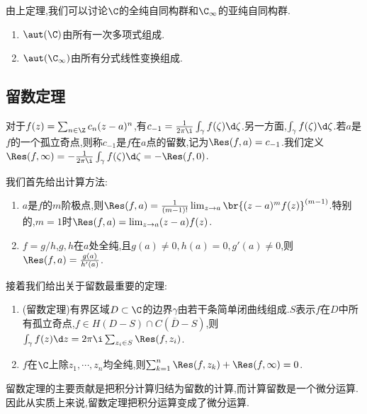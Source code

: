 \documentclass{article}
\begin{document}
由上定理,我们可以讨论$\C$的全纯自同构群和$\C_\infty$的亚纯自同构群.
\begin{enumerate}[resume]
    \item $\aut(\C)$由所有一次多项式组成.\\
    \item $\aut(\C_\infty)$由所有分式线性变换组成.\\
    \hint{\tbc}
\end{enumerate}

\subsection{留数定理}
对于$f(z)=\sum_{n\in\Z}c_n(z-a)^n$,有$c_{-1}=\frac{1}{2\pi\i}\int_\gamma f(\zeta)\d\zeta$.另一方面,$\int_\gamma f(\zeta)\d\zeta$.若$a$是$f$的一个孤立奇点,则称$c_{-1}$是$f$在$a$点的留数,记为$\Res(f,a)=c_{-1}$.我们定义$\Res(f,\infty)=-\frac{1}{2\pi\i}\int_\gamma f(\zeta)\d\zeta=-\Res(f,0)$.

我们首先给出计算方法:
\begin{enumerate}
    \item $a$是$f$的$m$阶极点,则$\Res(f,a)=\frac{1}{(m-1)!}\lim_{z\to a}\br{(z-a)^mf(z)}^{(m-1)}$.特别的,$m=1$时$\Res(f,a)=\lim_{z\to a}(z-a)f(z)$.\\
    \item $f=g/h$,$g,h$在$a$处全纯,且$g(a)\neq 0,h(a)=0,g'(a)\neq 0$,则$\Res(f,a)=\frac{g(a)}{h'(a)}$.
\end{enumerate}

接着我们给出关于留数最重要的定理:
\begin{enumerate}[resume]
    \item (留数定理)有界区域$D\subset \C$的边界$\gamma$由若干条简单闭曲线组成.$S$表示$f$在$D$中所有孤立奇点,$f\in H(D-S)\cap C(\overline{D}-S)$,则$\int_\gamma f(z)\d z=2\pi\i\sum_{z_i\in S}\Res(f,z_i)$.
    \item $f$在$\C$上除$z_1,\cdots,z_n$均全纯,则$\sum_{k=1}^n \Res(f,z_k)+\Res(f,\infty)=0$.
\end{enumerate}
留数定理的主要贡献是把积分计算归结为留数的计算,而计算留数是一个微分运算.因此从实质上来说,留数定理把积分运算变成了微分运算.
\end{document}
